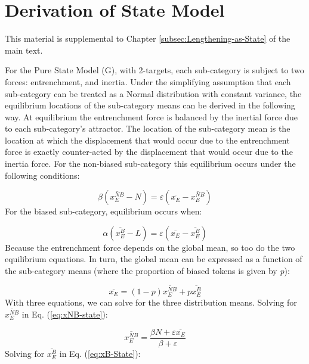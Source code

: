 \chapter{\label{chap:Appendix C}Derivation of State Model}

This material is supplemental to Chapter \ref{subsec:Lengthening-as-State}
of the main text.

For the Pure State Model (G), with 2-targets, each sub-category is
subject to two forces: entrenchment, and inertia. Under the simplifying
assumption that each sub-category can be treated as a Normal distribution
with constant variance, the equilibrium locations of the sub-category
means can be derived in the following way. At equilibrium the entrenchment
force is balanced by the inertial force due to each sub-category's
attractor. The location of the sub-category mean is the location at
which the displacement that would occur due to the entrenchment force
is exactly counter-acted by the displacement that would occur due
to the inertia force. For the non-biased sub-category this equilibrium
occurs under the following conditions:

\begin{equation}
\beta(\overline{x_{E}^{NB}}-N)=\varepsilon(\overline{x_{E}}-\overline{x_{E}^{NB}})\label{eq:xNB-state}
\end{equation}
For the biased sub-category, equilibrium occurs when:

\begin{equation}
\alpha(\overline{x_{E}^{B}}-L)=\varepsilon(\overline{x_{E}}-\overline{x_{E}^{B}})\label{eq:xB-State}
\end{equation}
Because the entrenchment force depends on the global mean, so too
do the two equilibrium equations. In turn, the global mean can be
expressed as a function of the sub-category means (where the proportion
of biased tokens is given by \emph{p}): 

\begin{equation}
\overline{x_{E}}=(1-p)\overline{x_{E}^{NB}}+p\overline{x_{E}^{B}}\label{eq:weighted-means}
\end{equation}
With three equations, we can solve for the three distribution means.
Solving for $\overline{x_{E}^{NB}}$ in Eq. (\ref{eq:xNB-state}):

\begin{equation}
\overline{x_{E}^{NB}}=\frac{\beta N+\varepsilon\overline{x_{E}}}{\beta+\varepsilon}
\end{equation}
Solving for $\overline{x_{E}^{B}}$ in Eq. (\ref{eq:xB-State}):

